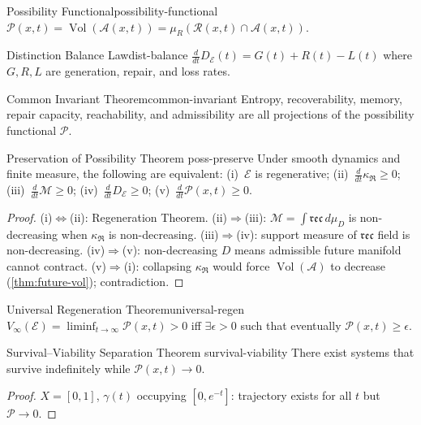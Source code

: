 \documentclass[12pt,twoside,openright]{book}
\newcommand{\reach}{\mathcal{R}}
\newcommand{\adm}{\mathcal{A}}
\newcommand{\repair}{\mathfrak{R}}
\newcommand{\reco}{\mathfrak{rec}}
\newcommand{\Vol}{\operatorname{Vol}}
\begin{document}
\begin{definition}{Possibility Functional}{possibility-functional}
  $\mathcal{P}(x,t)=\Vol(\adm(x,t))
  =\mu_R(\reach(x,t)\cap\adm(x,t))$.
\end{definition}

\begin{theorem}{Distinction Balance Law}{dist-balance}
  $\frac{d}{dt}D_\mathcal{E}(t)=G(t)+R(t)-L(t)$
  where $G,R,L$ are generation, repair, and loss rates.
\end{theorem}

\begin{theorem}{Common Invariant Theorem}{common-invariant}
  Entropy, recoverability, memory, repair capacity,
  reachability, and admissibility are all projections
  of the possibility functional $\mathcal{P}$.
\end{theorem}

\begin{theorem}{Preservation of Possibility Theorem}%
  {poss-preserve}
  Under smooth dynamics and finite measure, the following
  are equivalent:
  (i)~$\mathcal{E}$ is regenerative;
  (ii)~$\frac{d}{dt}\kappa_\repair\ge0$;
  (iii)~$\frac{d}{dt}\mathcal{M}\ge0$;
  (iv)~$\frac{d}{dt}D_\mathcal{E}\ge0$;
  (v)~$\frac{d}{dt}\mathcal{P}(x,t)\ge0$.
\end{theorem}
\begin{proof}
  (i)$\Leftrightarrow$(ii): Regeneration Theorem.
  (ii)$\Rightarrow$(iii): $\mathcal{M}=\int\reco\,d\mu_D$
  is non-decreasing when $\kappa_\repair$ is non-decreasing.
  (iii)$\Rightarrow$(iv): support measure of
  $\reco$ field is non-decreasing.
  (iv)$\Rightarrow$(v): non-decreasing $D$ means
  admissible future manifold cannot contract.
  (v)$\Rightarrow$(i): collapsing $\kappa_\repair$ would
  force $\Vol(\adm)$ to decrease
  (\cref{thm:future-vol}); contradiction.
\end{proof}

\begin{theorem}{Universal Regeneration Theorem}{universal-regen}
  $V_\infty(\mathcal{E})=\liminf_{t\to\infty}
  \mathcal{P}(x,t)>0$
  iff $\exists\epsilon>0$ such that eventually
  $\mathcal{P}(x,t)\ge\epsilon$.
\end{theorem}

\begin{theorem}{Survival--Viability Separation Theorem}%
  {survival-viability}
  There exist systems that survive indefinitely while
  $\mathcal{P}(x,t)\to0$.
\end{theorem}
\begin{proof}
  $X=[0,1]$, $\gamma(t)$ occupying $[0,e^{-t}]$:
  trajectory exists for all $t$ but
  $\mathcal{P}\to0$.
\end{proof}
\end{document}
